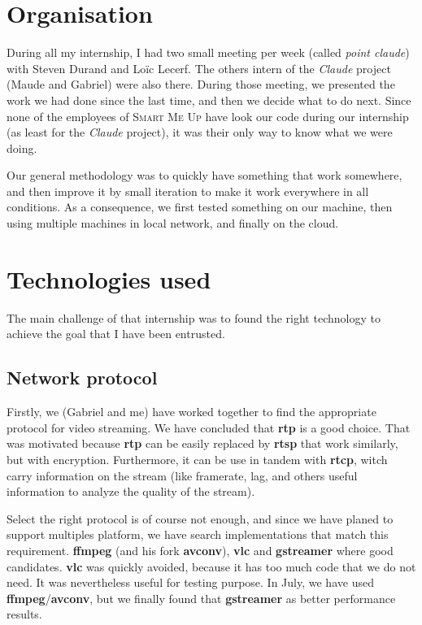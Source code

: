 \documentclass[a4paper,11pt]{custom}
\newcommand{\smu}{\textsc{Smart Me Up}\xspace}
\newcommand{\rtp}{\textbf{rtp}\xspace}
\newcommand{\rtcp}{\textbf{rtcp}\xspace}
\newcommand{\rtsp}{\textbf{rtsp}\xspace}
\newcommand{\vlc}{\textbf{vlc}\xspace}
\newcommand{\avconv}{\textbf{avconv}\xspace}
\newcommand{\ffmpeg}{\textbf{ffmpeg}\xspace}
\newcommand{\gstreamer}{\textbf{gstreamer}\xspace}
\newcommand{\claude}{\textit{Claude}\xspace}
\begin{document}
\section{Organisation}

During all my internship, I had two small meeting per week (called \textit{point
claude}) with Steven Durand and Loïc Lecerf. The others intern of the \claude{}
project (Maude and Gabriel) were also there. During those meeting, we presented
the work we had done since the last time, and then we decide what to do next.
Since none of the employees of \smu{} have look our code during our internship (as
least for the \claude{} project), it was their only way to know what we were
doing.

Our general methodology was to quickly have something that work somewhere, and
then improve it by small iteration to make it work everywhere in all conditions.
As a consequence, we first tested something on our machine, then using multiple
machines in local network, and finally on the cloud.


\section{Technologies used}
\label{sec:technologies}

The main challenge of that internship was to found the right technology to
achieve the goal that I have been entrusted.

\subsection{Network protocol}

Firstly, we (Gabriel and me) have worked together to find the appropriate
protocol for video streaming. We have concluded that \rtp{} is a good choice.
That was motivated because \rtp{} can be easily replaced by \rtsp{} that work
similarly, but with encryption. Furthermore, it can be use in tandem with
\rtcp, witch carry information on the stream (like framerate, lag, and others
useful information to analyze the quality of the stream).

Select the right protocol is of course not enough, and since we have planed to
support multiples platform, we have search implementations that match this
requirement. \ffmpeg{} (and his fork \avconv), \vlc{} and \gstreamer{} where good
candidates. \vlc{} was quickly avoided, because it has too much code that we do
not need. It was nevertheless useful for testing purpose. In July, we have used
\ffmpeg/\avconv, but we finally found that \gstreamer{} as better performance
results.
\end{document}
